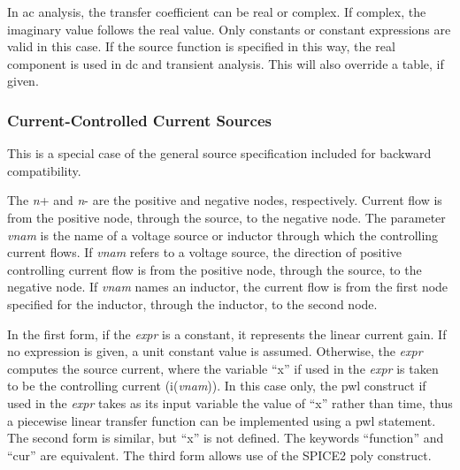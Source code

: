 In ac analysis, the transfer coefficient can be real or complex.  If
complex, the imaginary value follows the real value.  Only constants
or constant expressions are valid in this case.  If the source
function is specified in this way, the real component is used in dc
and transient analysis.  This will also override a table, if given.

\subsubsection{Current-Controlled Current Sources}


This is a special case of the general source specification included
for backward compatibility.


The {\it n\/}{\vt +} and {\it n\/}{\vt -} are the positive and
negative nodes, respectively.  Current flow is from the positive node,
through the source, to the negative node.  The parameter {\it vnam\/}
is the name of a voltage source or inductor through which the
controlling current flows.  If {\it vnam} refers to a voltage source,
the direction of positive controlling current flow is from the
positive node, through the source, to the negative node.  If {\it
vnam} names an inductor, the current flow is from the first node
specified for the inductor, through the inductor, to the second node. 

In the first form, if the {\it expr} is a constant, it represents the
linear current gain.  If no expression is given, a unit constant
value is assumed.  Otherwise, the {\it expr} computes the source
current, where the variable ``{\vt x}'' if used in the {\it expr} is
taken to be the controlling current (i({\it vnam\/})).  In this case
only, the {\vt pwl} construct if used in the {\it expr} takes as its
input variable the value of ``{\vt x}'' rather than time, thus a
piecewise linear transfer function can be implemented using a {\vt
pwl} statement.  The second form is similar, but ``{\vt x}'' is not
defined.  The keywords ``{\vt function}'' and ``{\vt cur}'' are
equivalent.  The third form allows use of the SPICE2 {\vt poly}
construct.

